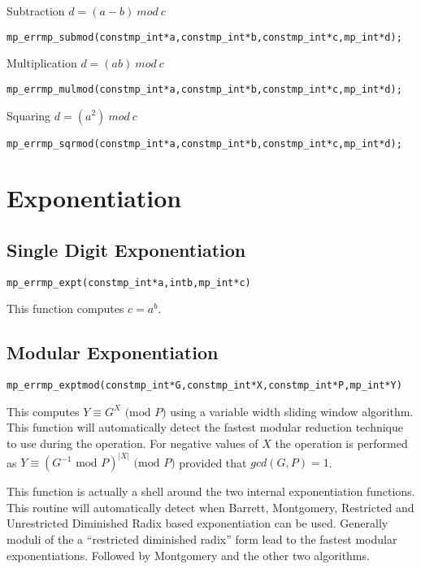 \documentclass[synpaper]{book}
\def\mod{{\mathit\ mod\ }}
\begin{document}
Subtraction  $d = (a - b) \mod c$
\begin{alltt}
mp_err mp_submod(const mp_int *a, const mp_int *b, const mp_int *c, mp_int *d);
\end{alltt}

Multiplication $d = (ab) \mod c$
\begin{alltt}
mp_err mp_mulmod(const mp_int *a, const mp_int *b, const mp_int *c, mp_int *d);
\end{alltt}

Squaring  $d = (a^2) \mod c$
\begin{alltt}
mp_err mp_sqrmod(const mp_int *a, const mp_int *b, const mp_int *c, mp_int *d);
\end{alltt}

\chapter{Exponentiation}
\section{Single Digit Exponentiation}
\begin{alltt}
mp_err mp_expt (const mp_int *a, int b, mp_int *c)
\end{alltt}
This function computes $c = a^b$.

\section{Modular Exponentiation}
\begin{alltt}
mp_err mp_exptmod (const mp_int *G, const mp_int *X, const mp_int *P, mp_int *Y)
\end{alltt}
This computes $Y \equiv G^X \mbox{ (mod }P\mbox{)}$ using a variable width sliding window
algorithm.  This function will automatically detect the fastest modular reduction technique to use
during the operation. For negative values of $X$ the operation is performed as $Y \equiv (G^{-1}
  \mbox{ mod }P)^{\vert X \vert} \mbox{ (mod }P\mbox{)}$ provided that $gcd(G, P) = 1$.

This function is actually a shell around the two internal exponentiation functions.  This routine
will automatically detect when Barrett, Montgomery, Restricted and Unrestricted Diminished Radix
based exponentiation can be used.  Generally moduli of the a ``restricted diminished radix'' form
lead to the fastest modular exponentiations. Followed by Montgomery and the other two algorithms.
\end{document}
